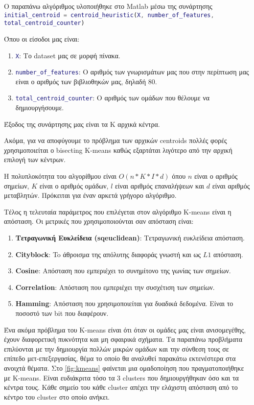 \sloppy Ο παραπάνω αλγόριθμος υλοποιήθηκε στο Matlab μέσω της συνάρτησης
\lstinline[language=MATLAB, breaklines=true]!initial_centroid = centroid_heuristic(X, number_of_features, total_centroid_counter)!

Όπου οι είσοδοι μας είναι:
\begin{enumerate}
    \item \lstinline[language=MATLAB]!X!: Το dataset μας σε μορφή πίνακα.
    \item \lstinline[language=MATLAB]!number_of_features!: Ο αριθμός των γνωρισμάτων μας που στην περίπτωση μας είναι ο αριθμός των βιβλιοθηκών μας, δηλαδή 80.
    \item \lstinline[language=MATLAB]!total_centroid_counter!: Ο αριθμός των ομάδων που θέλουμε να δημιουργήσουμε.
\end{enumerate}
Έξοδος της συνάρτησης μας είναι τα Κ αρχικά κέντρα.

Ακόμα, για να αποφύγουμε το πρόβλημα των αρχικών centroids πολλές φορές χρησιμοποιείται ο bisecting K-means καθώς εξαρτάται λιγότερο από την αρχική επιλογή των κέντρων.

Η πολυπλοκότητα του αλγορίθμου είναι $ O(n*K*I*d)$ όπου $n$ είναι ο αριθμός σημείων, $Κ$ είναι ο αριθμός ομάδων, $l$ είναι αριθμός επαναλήψεων και $d$ είναι αριθμός μεταβλητών. Πρόκειται για έναν αρκετά γρήγορο αλγόριθμο.

Τέλος η τελευταία παράμετρος που επιλέγεται στον αλγόριθμο K-means είναι η απόσταση. Οι μετρικές που χρησιμοποιούνται σαν απόσταση είναι:
\begin{enumerate}
    \item \textbf{Τετραγωνική Ευκλείδεια (sqeuclidean)}: Τετραγωνική ευκλείδεια απόσταση.
    \item \textbf{Cityblock}: To άθροισμα της απόλυτης διαφοράς γνωστή και ως $L1$ απόσταση.
    \item \textbf{Cosine}: Απόσταση που εμπεριέχει το συνημίτονο της γωνίας των σημείων.
    \item \textbf{Correlation}: Απόσταση που εμπεριέχει την συσχέτιση των σημείων.
    \item \textbf{Hamming}: Απόσταση που χρησιμοποιείται για δυαδικά δεδομένα. Είναι το ποσοστό των bit που διαφέρουν.
\end{enumerate}

Ένα ακόμα πρόβλημα του K-means είναι ότι όταν οι ομάδες μας είναι ανισομεγέθης, έχουν διαφορετική πυκνότητα και μη σφαιρικά σχήματα. Τα παραπάνω προβλήματα επιλύονται με την δημιουργία πολλών μικρών ομάδων και την σύνθεση τους σε επίπεδο μετ-επεξεργασίας, θέμα το οποίο θα αναλυθεί παρακάτω εκτενέστερα στα ανοιχτά θέματα.
Στο \hyperref[fig:kmeans]{\figurename{} \ref{fig:kmeans}}
φαίνεται μια ομαδοποίηση που πραγματοποιήθηκε με K-means. Είναι ευδιάκριτα τόσο τα 3 clusters που δημιουργήθηκαν όσο και τα κέντρα τους. Κάθε σημείο του κάθε cluster απέχει την ελάχιστη απόσταση από το κέντρο του cluster στο οποίο ανήκει.

